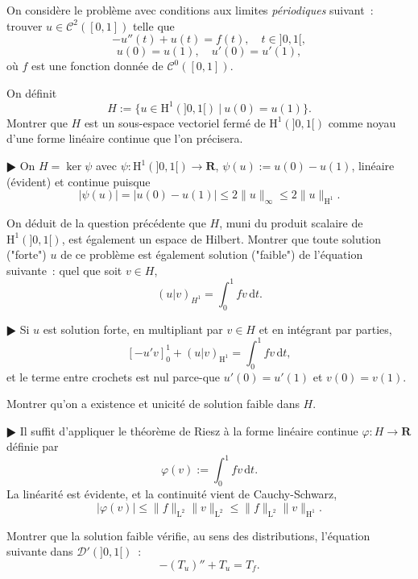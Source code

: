 \documentclass[11pt,a4paper]{article}
\def\R{\mathbf{R}}
\def\CC{\mathscr{C}}
\def\DD{\mathscr{D}}
\def\L{\mathrm{L}}
\def\H{\mathrm{H}}
\def\iy{\infty}
\def\d{\mathrm{d}}
\def\vphi{\varphi}
\theoremstyle{plain}
\theoremstyle{definition}
\begin{document}
\begin{Exercice}[6 points] On consid\`ere le probl\`eme avec conditions aux limites
\emph{p\'eriodiques} suivant~: trouver $u \in \CC^2([0,1])$ telle que
\[ -u''(t)+u(t) = f(t),\quad t \in ]0,1[, \]
\[ u(0)=u(1),\quad u'(0)=u'(1), \]
o\`u $f$ est une fonction donn\'ee de $\CC^0([0,1])$.

\begin{Question} On d\'efinit
\[ H := \{ u \in \H^1(]0,1[)\ |\ u(0)=u(1) \}. \]
Montrer que $H$ est un sous-espace vectoriel 
ferm\'e de $\H^1(]0,1[)$ comme noyau d'une forme
lin\'eaire continue que l'on pr\'ecisera.
\end{Question}

\begin{corr} $\RHD$ On $H=\ker\psi$ avec $\psi:\H^1(]0,1[) \to \R$,
$\psi(u):=u(0)-u(1)$, lin\'eaire (\'evident) et continue puisque
\[ |\psi(u)|=|u(0)-u(1)| \leq 2\|u\|_\iy \leq 2\|u\|_{\H^1}. \]
\end{corr}

\begin{Question} On d\'eduit de la question pr\'ec\'edente que $H$,
muni du produit scalaire de $\H^1(]0,1[)$, est \'egalement un espace de Hilbert.
Montrer que toute solution ("forte") $u$ de ce probl\`eme
est \'egalement solution ("faible") de l'\'equation suivante~: quel que soit $v \in H$,
\[ (u|v)_{H^1} = \int_0^1 fv\,\d t. \]
\end{Question}

\begin{corr} $\RHD$ Si $u$ est solution forte, en multipliant par $v \in H$ et en
int\'egrant par parties,
\[ [-u'v]_0^1+(u|v)_{\H^1} = \int_0^1 fv\,\d t, \]
et le terme entre crochets est nul parce-que $u'(0)=u'(1)$ et $v(0)=v(1)$.
\end{corr}

\begin{Question} Montrer qu'on a existence et unicit\'e de solution faible dans $H$.
\end{Question}

\begin{corr} $\RHD$ Il suffit d'appliquer le th\'eor\`eme de Riesz \`a la forme
lin\'eaire continue $\vphi : H \to \R$ d\'efinie par
\[ \vphi(v) := \int_0^1 fv\,\d t. \]
La lin\'earit\'e est \'evidente, et la continuit\'e vient de Cauchy-Schwarz,
\[ |\vphi(v)| \leq \|f\|_{\L^2}\|v\|_{\L^2} \leq \|f\|_{\L^2}\|v\|_{\H^1}. \]
\end{corr}

\begin{Question} Montrer que la solution faible v\'erifie, au sens des distributions,
l'\'e\-qua\-tion suivante dans $\DD'(]0,1[)$~:
\[ -(T_u)''+T_u = T_f. \]
\end{Question}


\end{Exercice}
\end{document}
